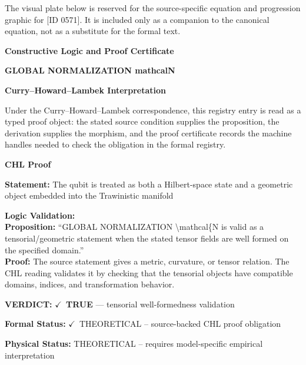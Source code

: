 \begingroup\footnotesize\sloppy
The visual plate below is reserved for the source-specific equation and progression graphic for [ID 0571]. It is included only as a companion to the canonical equation, not as a substitute for the formal text.
\par\endgroup
\ifTZPDarkEdition
{}
\fi

\clearpage
\begingroup\tzpsupportsetup
\noindent\textbf{\fontsize{10.8pt}{12.8pt}\selectfont [ID 0571] Constructive Logic and Proof Certificate}\par
\noindent\textbf{\fontsize{10pt}{12pt}\selectfont GLOBAL NORMALIZATION mathcalN}\par
\vspace{0.45em}
\begingroup
\footnotesize
\setlength{\parskip}{0.22em}
\setlength{\parindent}{0pt}
\noindent\textbf{Curry--Howard--Lambek Interpretation}\par
Under the Curry--Howard--Lambek correspondence, this registry entry is read as a typed proof
object: the stated source condition supplies the proposition, the derivation supplies the
morphism, and the proof certificate records the machine handles needed to check the obligation
in the formal registry.

\vspace{0.45em}
\noindent\textbf{CHL Proof}\par
\textbf{Statement:} The qubit is treated as both a Hilbert-space state and a geometric object embedded into
the Trawinistic manifold

\textbf{Logic Validation:}\\
\textbf{Proposition:} ``GLOBAL NORMALIZATION \textbackslash{}mathcal\{N is valid as a tensorial/geometric statement when the
stated tensor fields are well formed on the specified domain.''\\
\textbf{Proof:} The source statement gives a metric, curvature, or tensor relation. The CHL reading
validates it by checking that the tensorial objects have compatible domains, indices,
and transformation behavior.

\textbf{VERDICT:} \ensuremath{\checkmark}\ \textbf{TRUE} --- tensorial well-formedness validation

\textbf{Formal Status:} \ensuremath{\checkmark}\ THEORETICAL -- source-backed CHL proof obligation

\textbf{Physical Status:} THEORETICAL -- requires model-specific empirical interpretation
\par\vspace{0.45em}
\par
\ifTZPDarkEdition
{}
\fi
\endgroup
\endgroup
